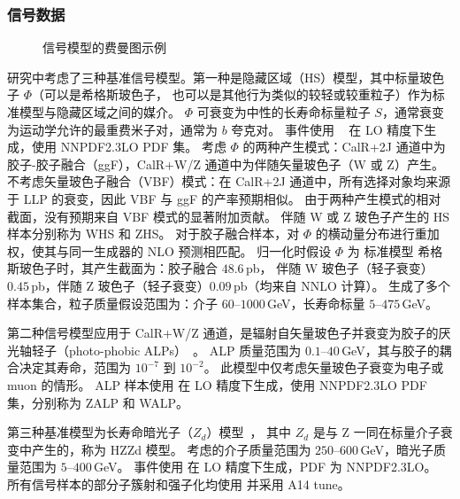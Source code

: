 \subsubsection{信号数据}
\begin{figure}[ht]
    \centering
    \hfill
    \hfill
    \caption{信号模型的费曼图示例}
    \label{fig:Feynman_diagram}
\end{figure}

研究中考虑了三种基准信号模型。第一种是隐藏区域（HS）模型，其中标量玻色子 $\Phi$（可以是希格斯玻色子，
也可以是其他行为类似的较轻或较重粒子）作为标准模型与隐藏区域之间的媒介。
$\Phi$ 可衰变为中性的长寿命标量粒子 $S$，通常衰变为运动学允许的最重费米子对，通常为 $b$ 夸克对。
事件使用 ~\cite{Alwall:2014hca} 在 LO 精度下生成，使用 NNPDF2.3LO PDF 集。
考虑 $\Phi$ 的两种产生模式：CalR+2J 通道中为胶子-胶子融合（ggF），CalR+W/Z 通道中为伴随矢量玻色子（W 或 Z）产生。
不考虑矢量玻色子融合（VBF）模式：在 CalR+2J 通道中，所有选择对象均来源于 LLP 的衰变，因此 VBF 与 ggF 的产率预期相似。
由于两种产生模式的相对截面，没有预期来自 VBF 模式的显著附加贡献。
伴随 W 或 Z 玻色子产生的 HS 样本分别称为 WHS 和 ZHS。
对于胶子融合样本，对 $\Phi$ 的横动量分布进行重加权，使其与同一生成器的 NLO 预测相匹配。
归一化时假设 $\Phi$ 为 标准模型 希格斯玻色子时，其产生截面为：胶子融合 $48.6$\,pb，
伴随 W 玻色子（轻子衰变）$0.45$\,pb，伴随 Z 玻色子（轻子衰变）$0.09$\,pb（均来自 NNLO 计算）。
生成了多个样本集合，粒子质量假设范围为：介子 $60$--$1000$\,GeV，长寿命标量 $5$--$475$\,GeV。

第二种信号模型应用于 CalR+W/Z 通道，是辐射自矢量玻色子并衰变为胶子的厌光轴轻子（photo-phobic ALPs）~\cite{Brivio:2017ije}。
ALP 质量范围为 $0.1$--$40$\,GeV，其与胶子的耦合决定其寿命，范围为 $10^{-7}$ 到 $10^{-2}$。
此模型中仅考虑矢量玻色子衰变为电子或 muon 的情形。
ALP 样本使用  在 LO 精度下生成，使用 NNPDF2.3LO PDF 集，分别称为 ZALP 和 WALP。

第三种基准模型为长寿命暗光子（$Z_d$）模型~\cite{Davoudiasl:2012ag, Davoudiasl:2013aya}，
其中 $Z_d$ 是与 Z 一同在标量介子衰变中产生的，称为 HZZd 模型。
考虑的介子质量范围为 $250$--$600$\,GeV，暗光子质量范围为 $5$--$400$\,GeV。
事件使用   在 LO 精度下生成，PDF 为 NNPDF2.3LO。
所有信号样本的部分子簇射和强子化均使用  并采用 A14 tune。

